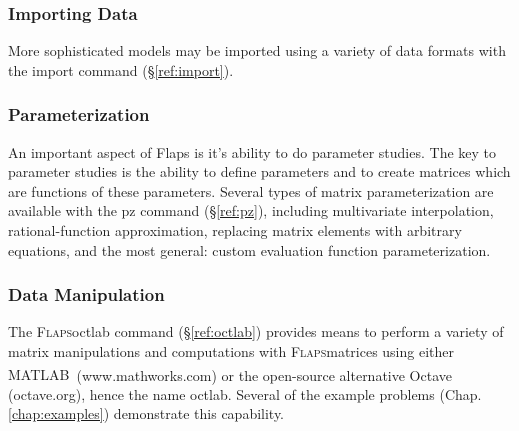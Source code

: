\documentclass[11pt,openany,twoside]{book}
\numberwithin{equation}{section}		%
\newcommand{\Cmd}[1]{{\sf #1}}
\newcommand{\Flaps}{\textsc{Flaps\:}}
\newcommand{\Matlab}{{\footnotesize{MATLAB\textsuperscript{\textregistered}}\:}}
\newcommand{\Sectref}[1]{\S\ref{#1}}
\newcommand{\Chapref}[1]{Chap. \ref{#1}}
\begin{document}
\subsubsection{Importing Data}
More sophisticated models may be imported using a variety of
data formats with the \Cmd{import} command (\Sectref{ref:import}).
        
\subsubsection{Parameterization}
An important aspect of Flaps is it's ability to do parameter
studies. The key to parameter studies is the ability to
define parameters and to create matrices which are functions of
these parameters. Several types of matrix parameterization are available
with the \Cmd{pz} command (\Sectref{ref:pz}),
including multivariate interpolation,
rational-function approximation, 
replacing matrix elements with arbitrary equations,
and the most general: custom evaluation function parameterization.
        
\subsubsection{Data Manipulation}
The \Flaps \Cmd{octlab} command (\Sectref{ref:octlab}) provides means
to perform a variety of matrix manipulations and computations with
\Flaps matrices using either \Matlab\ (www.mathworks.com)
\index{matlab@\Matlab}
or the open-source alternative Octave (octave.org), hence
the name \Cmd{octlab}.
Several of the example problems (\Chapref{chap:examples})
demonstrate this capability.
        
\end{document}
